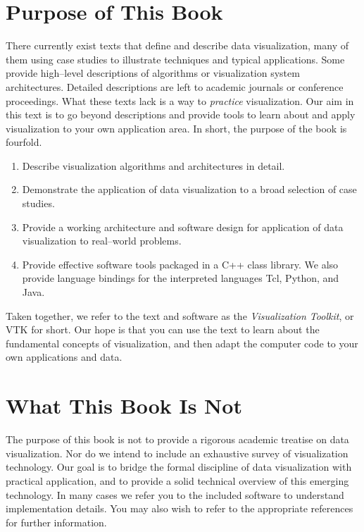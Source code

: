 \section{Purpose of This Book}

There currently exist texts that define and describe data visualization, many of them using case studies to illustrate techniques and typical applications. Some provide high--level descriptions of algorithms or visualization system architectures. Detailed descriptions are left to academic journals or conference proceedings. What these texts lack is a way to \emph{practice} visualization. Our aim in this text is to go beyond descriptions and provide tools to learn about and apply visualization to your own application area. In short, the purpose of the book is fourfold.

\begin{enumerate}
  \item Describe visualization algorithms and architectures in detail.

  \item Demonstrate the application of data visualization to a broad selection of case studies.

  \item Provide a working architecture and software design for application of data visualization to real--world problems.

  \item Provide effective software tools packaged in a C++ class library. We also provide language bindings for the interpreted languages Tcl, Python, and Java.
\end{enumerate}

Taken together, we refer to the text and software as the \emph{Visualization Toolkit}, or VTK for short. Our hope is that you can use the text to learn about the fundamental concepts of visualization, and then adapt the computer code to your own applications and data.

\section{What This Book Is Not}

The purpose of this book is not to provide a rigorous academic treatise on data visualization. Nor do we intend to include an exhaustive survey of visualization technology. Our goal is to bridge the formal discipline of data visualization with practical application, and to provide a solid technical overview of this emerging technology. In many cases we refer you to the included software to understand implementation details. You may also wish to refer to the appropriate references for further information.

